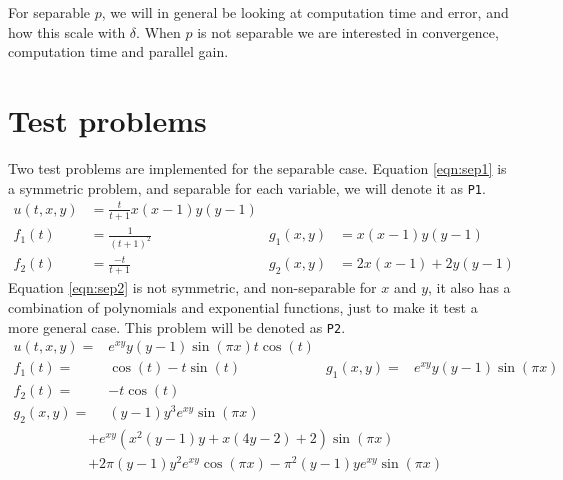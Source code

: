 For separable $p$, we will in general be looking at computation time and error, and how this scale with $\delta$. When $p$ is not separable we are interested in convergence, computation time and parallel gain. \\



\section{Test problems} \label{sec:test}
Two test problems are implemented for the separable case. Equation \eqref{eqn:sep1} is a symmetric problem, and separable for each variable, we will denote it as \texttt{P1}. 
\begin{equation} \label{eqn:sep1}
\begin{aligned}
 u(t,x,y)&= \frac{t}{t+1} x(x-1)y(y-1) \\
 f_1(t)&=\frac{1}{(t+1)^2} & g_1(x,y)&= x(x-1)y(y-1) \\
 f_2(t) &= \frac{-t}{t+1} & g_2(x,y)& = 2x(x-1) +2y(y-1)
 \end{aligned}
\end{equation}
Equation \eqref{eqn:sep2} is not symmetric, and non-separable for $x$ and $y$, it also has a combination of polynomials and exponential functions, just to make it test a more general case. 
This problem will be denoted as \texttt{P2}.\\
\begin{equation} \label{eqn:sep2}
\begin{aligned}
 u(t,x,y)=& e^{xy}y(y-1) \sin( \pi x)t \cos(t)& \\
 f_1(t) =& \cos(t)-t \sin(t)  & g_1(x,y) =&e^{xy}y(y-1) \sin( \pi x)\\
 f_2(t) =& -t \cos(t) \\ g_2(x,y) =&(y-1)y^3e^{xy} \sin ( \pi x)
 \end{aligned}
\end{equation}
\begin{equation*}
\begin{aligned}
&+e^{xy}(x^2(y-1)y+x(4y-2)+2) \sin( \pi x) \\&+2 \pi (y-1) y^2 e^{xy} \cos( \pi x)- \pi^2 (y-1)y e^{xy} \sin( \pi x )
 \end{aligned}
\end{equation*}

